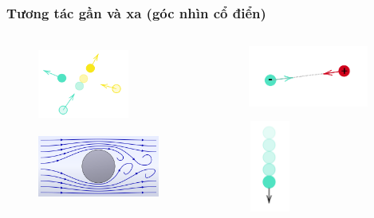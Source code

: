 \begin{frame}
\frametitle{Tương tác gần và xa (góc nhìn cổ điển)}
\begin{columns}
    \begin{column}{0.5\textwidth}
        \begin{figure}[H]
            \centering
            \includegraphics[width=3cm, height=2.5cm]{Slides/Figure/colision1.png}
        \end{figure}
        \begin{figure}[H]
            \centering
            \includegraphics[width=4cm, height=2cm]{Slides/Figure/fluid_dynamics.png}
        \end{figure}
    \end{column}
    \begin{column}{0.5\textwidth}
        \begin{figure}
            \centering
            \includegraphics[width=4cm, height=2cm]{Slides/Figure/atraction.png}
        \end{figure}
        \begin{figure}
            \centering
            \includegraphics[width=1.5cm, height=3cm]{Slides/Figure/free fall.png}
        \end{figure}
    \end{column}
\end{columns}
\end{frame}
